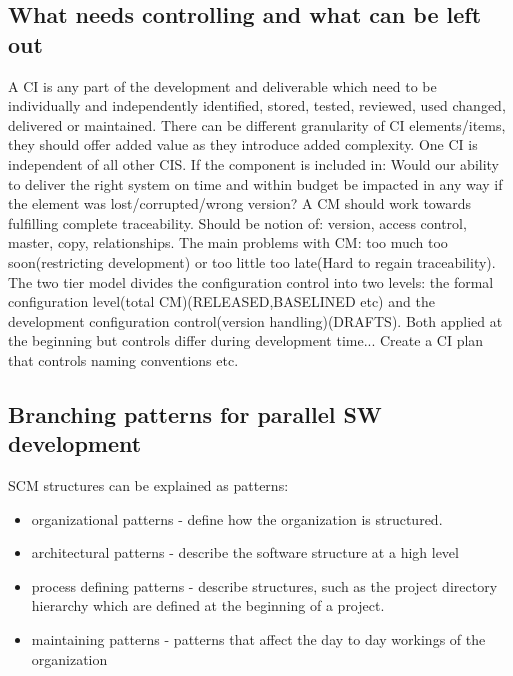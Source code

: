 \subsection{What needs controlling and what can be left out}
A CI is any part of the development and deliverable which need to be individually and independently identified, stored, tested, reviewed, used changed, delivered or maintained. There can be different 
granularity of CI elements/items, they should offer added value as they introduce added complexity. One CI is independent of all other CIS.
If the component is included in: Would our ability to deliver the right system on time and within budget be impacted in any way if the element was lost/corrupted/wrong version? 
A CM should work towards fulfilling complete traceability. Should be notion of: version, access control, master, copy, relationships.
The main problems with CM: too much too soon(restricting development) or too little too late(Hard to regain traceability). The two tier model divides the configuration control into two levels:
the formal configuration level(total CM)(RELEASED,BASELINED etc) and the development configuration control(version handling)(DRAFTS). Both applied at the beginning but controls differ during development time... 
Create a CI plan that controls naming conventions etc. 
\subsection{Branching patterns for parallel SW development}
SCM structures can be explained as patterns:
\begin{itemize}
    \item organizational patterns - define how the organization is structured.
    \item architectural patterns - describe the software structure at a high level
    \item process defining patterns - describe structures, such as the project directory hierarchy which are defined at the beginning of a project.
    \item maintaining patterns - patterns that affect the day to day workings of the organization
\end{itemize}
